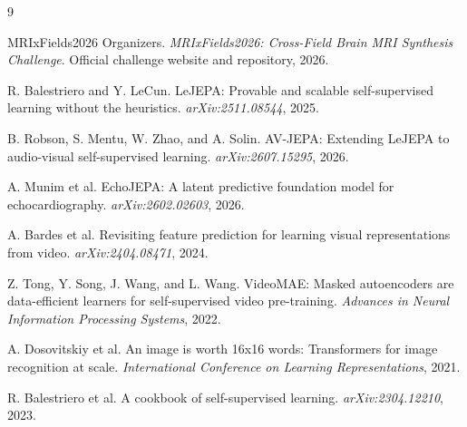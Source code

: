 \documentclass[10pt]{article}
\begin{document}
\vspace{-0.4em}
\footnotesize
\begin{thebibliography}{9}
\setlength{\itemsep}{-1pt}

MRIxFields2026 Organizers.
\newblock \emph{MRIxFields2026: Cross-Field Brain MRI Synthesis Challenge}.
\newblock Official challenge website and repository, 2026.

R. Balestriero and Y. LeCun.
\newblock LeJEPA: Provable and scalable self-supervised learning without the heuristics.
\newblock \emph{arXiv:2511.08544}, 2025.

B. Robson, S. Mentu, W. Zhao, and A. Solin.
\newblock AV-JEPA: Extending LeJEPA to audio-visual self-supervised learning.
\newblock \emph{arXiv:2607.15295}, 2026.

A. Munim et al.
\newblock EchoJEPA: A latent predictive foundation model for echocardiography.
\newblock \emph{arXiv:2602.02603}, 2026.

A. Bardes et al.
\newblock Revisiting feature prediction for learning visual representations from video.
\newblock \emph{arXiv:2404.08471}, 2024.

Z. Tong, Y. Song, J. Wang, and L. Wang.
\newblock VideoMAE: Masked autoencoders are data-efficient learners for self-supervised video pre-training.
\newblock \emph{Advances in Neural Information Processing Systems}, 2022.

A. Dosovitskiy et al.
\newblock An image is worth 16x16 words: Transformers for image recognition at scale.
\newblock \emph{International Conference on Learning Representations}, 2021.

R. Balestriero et al.
\newblock A cookbook of self-supervised learning.
\newblock \emph{arXiv:2304.12210}, 2023.

\end{thebibliography}
\end{document}
